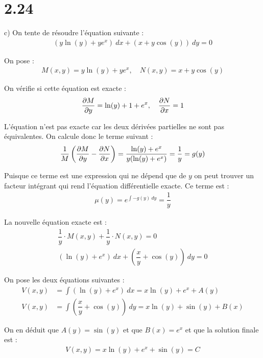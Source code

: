 \section*{2.24}

c) On tente de résoudre l'équation suivante :
\begin{align*}
    (y\ln(y) +ye^x)\ dx + (x + y\cos(y))\ dy = 0
\end{align*}

On pose :
\begin{align*}
    M(x,y) = y\ln(y) +ye^x,\quad N(x,y) = x + y\cos(y)
\end{align*}

On vérifie si cette équation est exacte :
\begin{align*}
    \dfrac{\partial M}{\partial y} = \ln(y) + 1 + e^x,\quad \dfrac{\partial N}{\partial x} = 1
\end{align*}

L'équation n'est pas exacte car les deux dérivées partielles ne sont pas
équivalentes. On calcule donc le terme suivant :
\begin{align*}
    \dfrac{1}{M}\left(\dfrac{\partial M}{\partial y} - \dfrac{\partial N}{\partial x} \right) = \dfrac{\ln(y)+e^x}{y(\ln(y)+e^x)}
    = \dfrac{1}{y} = g(y)
\end{align*}

Puisque ce terme est une expression qui ne dépend que de $y$ on peut trouver un
facteur intégrant qui rend l'équation différentielle exacte. Ce terme est :
\begin{align*}
    \mu(y) = e^{\int{-g(y)}\ dy} = \dfrac{1}{y}
\end{align*}

La nouvelle équation exacte est :
\begin{gather*}
    \dfrac{1}{y}\cdot M(x,y) + \dfrac{1}{y}\cdot N(x,y) = 0 \\
    (\ln(y) +e^x)\ dx + \left(\dfrac{x}{y} + \cos(y)\right)\ dy = 0
\end{gather*}

On pose les deux équations suivantes :
\begin{align*}
    V(x,y) &= \int{(\ln(y) +e^x)\ dx} = x\ln(y) +e^x +A(y) \\
    V(x,y) &= \int{\left(\dfrac{x}{y} +\cos(y)\right)\ dy} =
    x\ln(y) +\sin(y) +B(x)
\end{align*}

On en déduit que $A(y) = \sin(y)$ et que $B(x) = e^x$ et que la solution finale
est :
\begin{align*}
    V(x,y) = x\ln(y) +e^x +\sin(y) = C
\end{align*}
